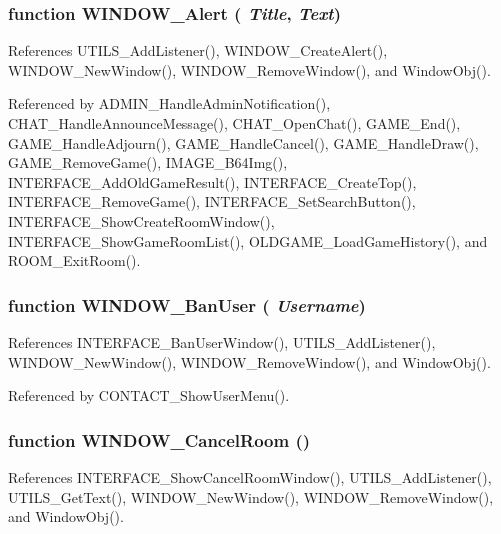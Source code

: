 \subsubsection{\setlength{\rightskip}{0pt plus 5cm}function WINDOW\_\-Alert ( {\em Title}, \/   {\em Text})}\label{window_2window_8js_a1b10eccd2c596a7a41b95bc3a55c851}




References UTILS\_\-AddListener(), WINDOW\_\-CreateAlert(), WINDOW\_\-NewWindow(), WINDOW\_\-RemoveWindow(), and WindowObj().

Referenced by ADMIN\_\-HandleAdminNotification(), CHAT\_\-HandleAnnounceMessage(), CHAT\_\-OpenChat(), GAME\_\-End(), GAME\_\-HandleAdjourn(), GAME\_\-HandleCancel(), GAME\_\-HandleDraw(), GAME\_\-RemoveGame(), IMAGE\_\-B64Img(), INTERFACE\_\-AddOldGameResult(), INTERFACE\_\-CreateTop(), INTERFACE\_\-RemoveGame(), INTERFACE\_\-SetSearchButton(), INTERFACE\_\-ShowCreateRoomWindow(), INTERFACE\_\-ShowGameRoomList(), OLDGAME\_\-LoadGameHistory(), and ROOM\_\-ExitRoom().
\subsubsection{\setlength{\rightskip}{0pt plus 5cm}function WINDOW\_\-BanUser ( {\em Username})}\label{window_2window_8js_5eb3c3f409de48353b62792ae5f3e10c}




References INTERFACE\_\-BanUserWindow(), UTILS\_\-AddListener(), WINDOW\_\-NewWindow(), WINDOW\_\-RemoveWindow(), and WindowObj().

Referenced by CONTACT\_\-ShowUserMenu().
\subsubsection{\setlength{\rightskip}{0pt plus 5cm}function WINDOW\_\-CancelRoom ()}\label{window_2window_8js_03cf2ff49b3e97f239cdb0eb00189f75}




References INTERFACE\_\-ShowCancelRoomWindow(), UTILS\_\-AddListener(), UTILS\_\-GetText(), WINDOW\_\-NewWindow(), WINDOW\_\-RemoveWindow(), and WindowObj().
